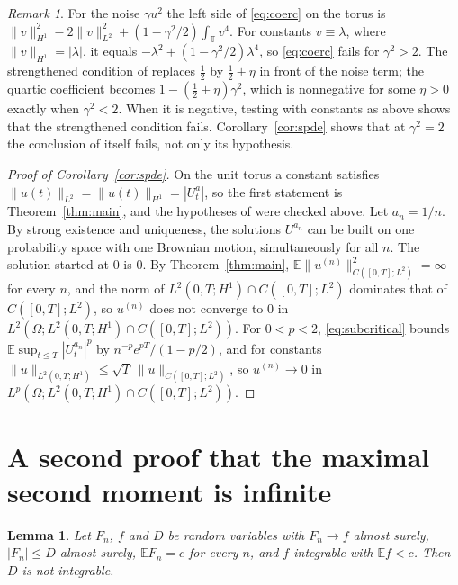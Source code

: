 \documentclass[11pt]{amsart}
\newtheorem{lemma}[theorem]{Lemma}
\theoremstyle{remark}
\newtheorem{remark}[theorem]{Remark}
\newcommand{\E}{\mathbb E}
\newcommand{\T}{\mathbb T}
\begin{document}
\begin{remark}\label{rem:threshold}
For the noise $\gamma u^2$ the left side of \eqref{eq:coerc} on the torus is $\|v\|_{H^1}^2-2\|v\|_{L^2}^2+(1-\gamma^2/2)\int_\T v^4$. For constants $v\equiv\lambda$, where $\|v\|_{H^1}=|\lambda|$, it equals $-\lambda^2+(1-\gamma^2/2)\lambda^4$, so \eqref{eq:coerc} fails for $\gamma^2>2$. The strengthened condition of \cite[Section~6.3.1]{AV25} replaces $\frac12$ by $\frac12+\eta$ in front of the noise term; the quartic coefficient becomes $1-(\frac12+\eta)\gamma^2$, which is nonnegative for some $\eta>0$ exactly when $\gamma^2<2$. When it is negative, testing with constants as above shows that the strengthened condition fails. Corollary~\ref{cor:spde} shows that at $\gamma^2=2$ the conclusion of \cite[Section~6.3.1]{AV25} itself fails, not only its hypothesis.
\end{remark}

\begin{proof}[Proof of Corollary~\ref{cor:spde}]
On the unit torus a constant satisfies $\|u(t)\|_{L^2}=\|u(t)\|_{H^1}=|U_t^a|$, so the first statement is Theorem~\ref{thm:main}, and the hypotheses of \cite[Theorem~6.4]{AV25} were checked above. Let $a_n=1/n$. By strong existence and uniqueness, the solutions $U^{a_n}$ can be built on one probability space with one Brownian motion, simultaneously for all $n$. The solution started at $0$ is $0$. By Theorem~\ref{thm:main}, $\E\|u^{(n)}\|_{C([0,T];L^2)}^2=\infty$ for every $n$, and the norm of $L^2(0,T;H^1)\cap C([0,T];L^2)$ dominates that of $C([0,T];L^2)$, so $u^{(n)}$ does not converge to $0$ in $L^2(\Omega;L^2(0,T;H^1)\cap C([0,T];L^2))$. For $0<p<2$, \eqref{eq:subcritical} bounds $\E\sup_{t\le T}|U_t^{a_n}|^p$ by $n^{-p}e^{pT}/(1-p/2)$, and for constants $\|u\|_{L^2(0,T;H^1)}\le\sqrt T\,\|u\|_{C([0,T];L^2)}$, so $u^{(n)}\to0$ in $L^p(\Omega;L^2(0,T;H^1)\cap C([0,T];L^2))$.
\end{proof}

\section{A second proof that the maximal second moment is infinite}\label{sec:defect}

\begin{lemma}\label{lem:defect}
Let $F_n$, $f$ and $D$ be random variables with $F_n\to f$ almost surely, $|F_n|\le D$ almost surely, $\E F_n=c$ for every $n$, and $f$ integrable with $\E f<c$. Then $D$ is not integrable.
\end{lemma}
\end{document}
